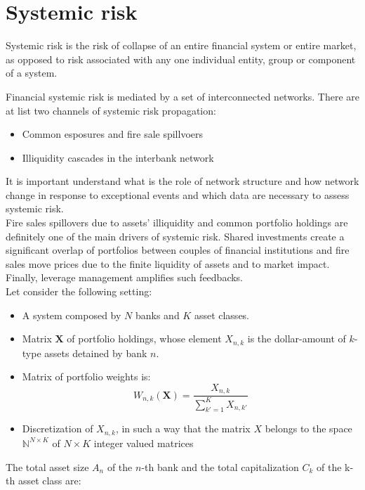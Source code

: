\section{Systemic risk}
\begin{mydefinition}
	Systemic risk is the risk of collapse of an entire financial system or entire market, as opposed to risk associated with any one individual entity, group or component of
	a system.
\end{mydefinition}
Financial systemic risk is mediated by a set of interconnected networks. There are at list two channels of systemic risk propagation:
\begin{itemize}
	\item Common esposures and fire sale spillvoers
	\item Illiquidity cascades in the interbank network
\end{itemize}
It is important understand what is the role of network structure and how network change in response to exceptional events and which data are necessary to assess systemic risk.\\
Fire sales spillovers due to assets’ illiquidity and common portfolio holdings are definitely one of the main drivers of systemic risk. Shared investments create a significant overlap of portfolios between couples of financial institutions and fire sales move prices due to the finite liquidity of assets and to market impact. Finally, leverage management amplifies such feedbacks.\\
Let consider the following setting:
\begin{mysetting}
	\begin{itemize}
		\item A system composed by $N$ banks and $K$ asset classes. 
		\item Matrix $\textbf{X}$ of portfolio holdings, whose element $X_{n,k}$ is the dollar-amount of $k$-type assets detained by bank $n$.
		\item Matrix of portfolio weights is:
		\[
		W_{n,k}(\mathbf{X}) = \frac{X_{n,k}}{\sum_{k'=1}^{K} X_{n,k'}}
		\]
		\item Discretization of $X_{n,k}$, in such a way that the matrix $X$ belongs to the space $\mathbb{N}^{N\times K}$ of $N \times K$ integer valued matrices
	 \end{itemize}
\end{mysetting}
The total asset size $A_n$ of the $n$-th bank and the total capitalization $C_k$ of the k-th asset class are:
